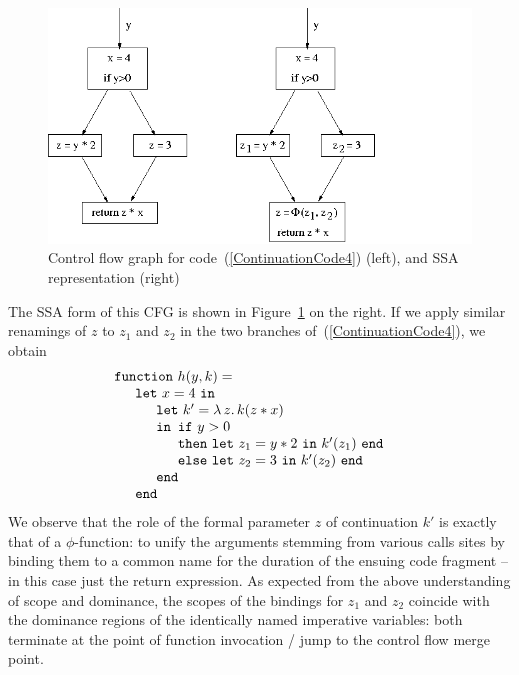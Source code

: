 \begin{figure}
\begin{center}
\includegraphics[scale=0.5]{FunctionalCode1CFG.png}
\end{center}
\caption{\label{FigureCFGForSharedContinuation} Control flow graph for code~(\ref{ContinuationCode4}) (left), and SSA representation (right)}
\end{figure}

The SSA form of this CFG is shown in
Figure~\ref{FigureCFGForSharedContinuation} on the right. If we apply
similar renamings of $z$ to $z_1$ and $z_2$ in the two branches
of~(\ref{ContinuationCode4}), we obtain
\begin{equation}
\label{ContinuationCode5}
\begin{array}{l}
\mathtt{function}\ h (y, k) =\\
\quad
  \begin{array}{l}
    \mathtt{let}\ x=4\ \mathtt{in} \\
    \quad \begin{array}{l}
            \mathtt{let}\ k' = \lambda\, z .\, k (z*x)\\
            \mathtt{in}
               \begin{array}[t]{l}
                 \mathtt{if}\ y>0\\
                 \mathtt{then\ let}\ z_1 = y*2\ \mathtt{in}\ k'(z_1)\ \mathtt{end}\\
                 \mathtt{else\ let}\ z_2 = 3\ \mathtt{in}\ k'(z_2)\ \mathtt{end}
               \end{array}\\
            \mathtt{end}
          \end{array} \\
    \mathtt{end}
  \end{array}
\end{array}
\end{equation}
We observe that the role of the formal parameter $z$ of continuation
$k'$ is exactly that of a $\phi$-function: to unify the arguments
stemming from various calls sites by binding them to a common name for
the duration of the ensuing code fragment -- in this case just the
return expression. As expected from the above understanding of scope
and dominance, the scopes of the bindings for $z_1$ and $z_2$ coincide
with the dominance regions of the identically named imperative
variables: both terminate at the point of function invocation / jump
to the control flow merge point.

